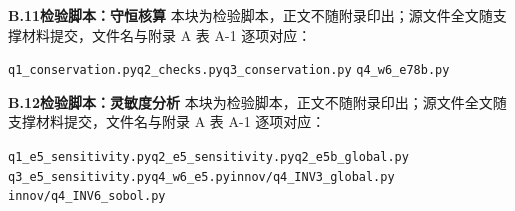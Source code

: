 \noindent\textbf{B.11\quad 检验脚本：守恒核算}
\noindent\footnotesize 本块为检验脚本，正文不随附录印出；源文件全文随支撑材料提交，文件名与附录 A 表 A-1 逐项对应：
\begingroup\raggedright\sloppy
\noindent \texttt{q1\_\allowbreak{}conservation.py}\quad \texttt{q2\_\allowbreak{}checks.py}\quad \texttt{q3\_\allowbreak{}conservation.py}
\noindent \texttt{q4\_\allowbreak{}w6\_\allowbreak{}e78b.py}
\par\endgroup

\noindent\textbf{B.12\quad 检验脚本：灵敏度分析}
\noindent\footnotesize 本块为检验脚本，正文不随附录印出；源文件全文随支撑材料提交，文件名与附录 A 表 A-1 逐项对应：
\begingroup\raggedright\sloppy
\noindent \texttt{q1\_\allowbreak{}e5\_\allowbreak{}sensitivity.py}\quad \texttt{q2\_\allowbreak{}e5\_\allowbreak{}sensitivity.py}\quad \texttt{q2\_\allowbreak{}e5b\_\allowbreak{}global.py}
\noindent \texttt{q3\_\allowbreak{}e5\_\allowbreak{}sensitivity.py}\quad \texttt{q4\_\allowbreak{}w6\_\allowbreak{}e5.py}\quad \texttt{innov/\allowbreak{}q4\_\allowbreak{}INV3\_\allowbreak{}global.py}
\noindent \texttt{innov/\allowbreak{}q4\_\allowbreak{}INV6\_\allowbreak{}sobol.py}
\par\endgroup

